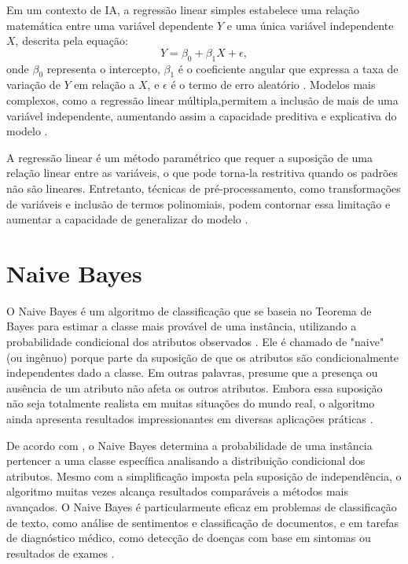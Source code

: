 Em um contexto de IA, a regressão linear simples estabelece uma relação matemática entre uma variável dependente \( Y \) e uma única variável independente \( X \), descrita pela equação:
\[
Y = \beta_0 + \beta_1 X + \epsilon,
\]
onde \( \beta_0 \) representa o intercepto, \( \beta_1 \) é o coeficiente angular que expressa a taxa de variação de \( Y \) em relação a \( X \), e \( \epsilon \) é o termo de erro aleatório \cite{rodrigues}. Modelos mais complexos, como a regressão linear múltipla,permitem a inclusão de mais de uma variável independente, aumentando assim a capacidade preditiva e explicativa do modelo \cite{rodrigues}.

A regressão linear é um método paramétrico que requer a suposição de uma relação linear entre as variáveis, o que pode torna-la restritiva quando os padrões não são lineares. Entretanto, técnicas de pré-processamento, como transformações de variáveis e inclusão de termos polinomiais, podem contornar essa limitação e aumentar a capacidade de generalizar do modelo \cite{montgomery2009}.

\section{Naive Bayes}
O Naive Bayes é um algoritmo de classificação que se baseia no Teorema de Bayes para estimar a classe mais provável de uma instância, utilizando a probabilidade condicional dos atributos observados \cite{rish2001}. Ele é chamado de "naive" (ou ingênuo) porque parte da suposição de que os atributos são condicionalmente independentes dado a classe. Em outras palavras, presume que a presença ou ausência de um atributo não afeta os outros atributos. Embora essa suposição não seja totalmente realista em muitas situações do mundo real, o algoritmo ainda apresenta resultados impressionantes em diversas aplicações práticas \cite{rish2001}.

De acordo com , o Naive Bayes determina a probabilidade de uma instância pertencer a uma classe específica analisando a distribuição condicional dos atributos. Mesmo com a simplificação imposta pela suposição de independência, o algoritmo muitas vezes alcança resultados comparáveis a métodos mais avançados. O Naive Bayes é particularmente eficaz em problemas de classificação de texto, como análise de sentimentos e classificação de documentos, e em tarefas de diagnóstico médico, como detecção de doenças com base em sintomas ou resultados de exames \cite{rish2001}.


